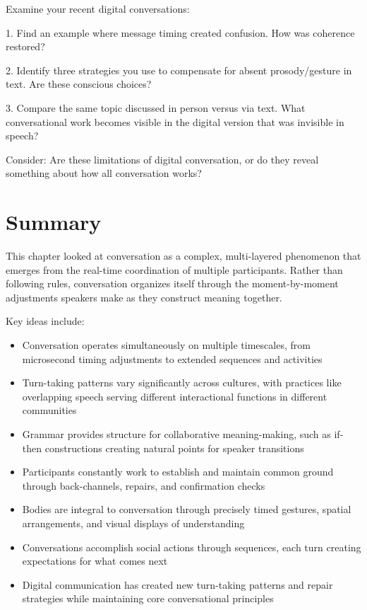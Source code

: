 \begin{tcolorbox}[title=Exercise: Digital Transformations, colback=white, colframe=teal!75!black, fonttitle=\bfseries]
Examine your recent digital conversations:

1. Find an example where message timing created confusion. How was coherence restored?

2. Identify three strategies you use to compensate for absent prosody/gesture in text. Are these conscious choices?

3. Compare the same topic discussed in person versus via text. What conversational work becomes visible in the digital version that was invisible in speech?

Consider: Are these limitations of digital conversation, or do they reveal something about how all conversation works?
\end{tcolorbox}

\section{Summary}

This chapter looked at conversation as a complex, multi-layered phenomenon that emerges from the real-time coordination of multiple participants. Rather than following rules, conversation organizes itself through the moment-by-moment adjustments speakers make as they construct meaning together.

Key ideas include:

\begin{itemize}[noitemsep]
\item Conversation operates simultaneously on multiple timescales, from microsecond timing adjustments to extended sequences and activities
\item Turn-taking patterns vary significantly across cultures, with practices like overlapping speech serving different interactional functions in different communities
\item Grammar provides structure for collaborative meaning-making, such as if-then constructions creating natural points for speaker transitions
\item Participants constantly work to establish and maintain common ground through back-channels, repairs, and confirmation checks
\item Bodies are integral to conversation through precisely timed gestures, spatial arrangements, and visual displays of understanding
\item Conversations accomplish social actions through sequences, each turn creating expectations for what comes next
\item Digital communication has created new turn-taking patterns and repair strategies while maintaining core conversational principles
\end{itemize}

